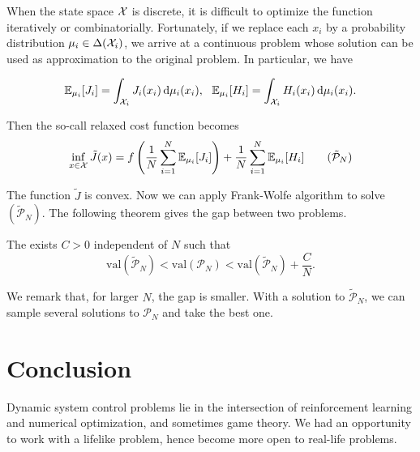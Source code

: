 When the state space $\mathcal{X}$ is discrete, it is difficult to optimize the function iteratively or combinatorially. Fortunately, if we replace each $x_i$ by a probability distribution $\mu_i\in\Delta(\mathcal{X}_i)$, we arrive at a continuous problem whose solution can be used as approximation to the original problem. In particular, we have

\begin{equation}
    \mathbb{E}_{\mu_i}[J_i] = \int_{\mathcal{X}_i} J_i(x_i)\,\mathrm{d} \mu_i(x_i), \,\,\,\, \mathbb{E}_{\mu_i}[H_i] = \int_{\mathcal{X}_i} H_i(x_i)\,\mathrm{d} \mu_i(x_i).
\end{equation}

Then the so-call relaxed cost function becomes
\begin{equation}
    \inf\limits_{x\in\X} \tilde{J}(x) = f\left(\dfrac{1}{N}\sum\limits_{i=1}^N \EE_{\mu_i}[J_i]\right) + \dfrac{1}{N}\sum\limits_{i=1}^N \EE_{\mu_i}[H_i] \tag{$\tilde{\mathcal{P}}_N$}
\end{equation}

The function $\tilde{J}$ is convex. Now we can apply Frank-Wolfe algorithm to solve $(\tilde{\mathcal{P}}_N)$. The following theorem gives the gap between two problems.

\begin{theorem}
    The exists $C > 0$ independent of $N$ such that
    \begin{equation}
        \mathrm{val}(\tilde{\mathcal{P}}_N) < \mathrm{val}(\mathcal{P}_N) < \mathrm{val}(\tilde{\mathcal{P}}_N) + \dfrac{C}{N}.
    \end{equation}
\end{theorem}

We remark that, for larger $N$, the gap is smaller. With a solution to  $\tilde{\mathcal{P}}_N$, we can sample several solutions to $\mathcal{P}_N$ and take the best one.

\section{Conclusion}
Dynamic system control problems lie in the intersection of reinforcement learning and numerical optimization, and sometimes game theory. We had an opportunity to work with a lifelike problem, hence become more open to real-life problems.

